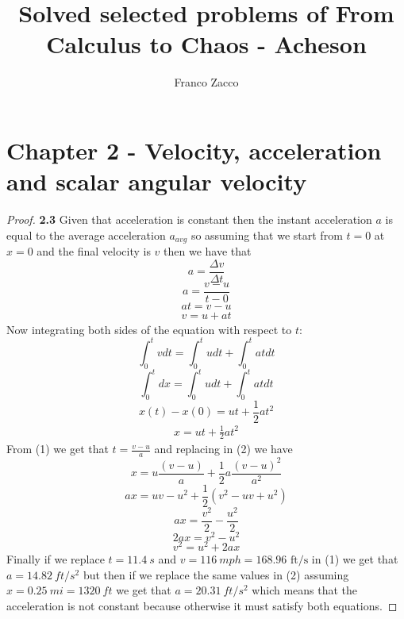 \documentclass[11pt]{article}
\title{\textbf{Solved selected problems of From Calculus to Chaos - Acheson}}
\author{Franco Zacco}
\date{}
\begin{document}
\maketitle
\thispagestyle{empty}

\section*{Chapter 2 - Velocity, acceleration and scalar angular velocity}

	\begin{proof}{\textbf{2.3}} Given that acceleration is constant then the
        instant acceleration $a$ is equal to the average acceleration $a_{avg}$
        so assuming that we start from $t=0$ at $x=0$ and the final velocity
        is $v$ then we have that
        $$a = \frac{\Delta v}{\Delta t}$$
        $$a = \frac{v - u}{t - 0}$$
        $$at = v - u$$
        \begin{align}
            v = u + at
        \end{align}
        Now integrating both sides of the equation with respect to $t$:
        $$\int_0^t{vdt}=\int_0^t{udt}+\int_0^t{atdt}$$
        $$\int_{0}^t{dx}=\int_0^t{udt}+\int_0^t{atdt}$$
        $$x(t) - x(0) = ut + \frac{1}{2}at^2$$
        \begin{align}
            x = ut + \frac{1}{2}at^2
        \end{align}
        From (1) we get that $t = \frac{v-u}{a}$ and replacing in (2) we have
        $$x = u\frac{(v-u)}{a} + \frac{1}{2}a\frac{(v-u)^2}{a^2}$$
        $$ax = uv - u^2 + \frac{1}{2}(v^2 - uv + u^2)$$
        $$ax = \frac{v^2}{2} - \frac{u^2}{2}$$
        $$2ax = v^2 - u^2$$
        $$v^2 = u^2 + 2ax$$
        Finally if we replace $t=11.4~\si{s}$ and
        $v=116~\si{mph}=168.96\text{ ft/s}$ in (1) we get that
        $a = 14.82~\si{ ft/s^2}$ but then if we replace the same values in (2)
        assuming $x=0.25~\si{mi} =1320~\si{ft}$ we get that
        $a = 20.31~\si{ft/s^2}$ which means that the acceleration is not 
        constant because otherwise it must satisfy both equations.
    \end{proof}
\end{document}
